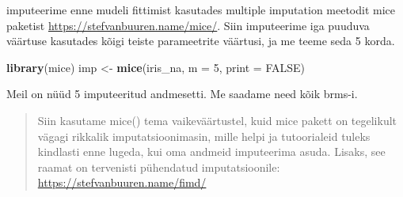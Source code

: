 \documentclass[]{book}
\newenvironment{Shaded}{\begin{snugshade}}{\end{snugshade}}
\newcommand{\KeywordTok}[1]{\textcolor[rgb]{0.13,0.29,0.53}{\textbf{#1}}}
\newcommand{\DataTypeTok}[1]{\textcolor[rgb]{0.13,0.29,0.53}{#1}}
\newcommand{\DecValTok}[1]{\textcolor[rgb]{0.00,0.00,0.81}{#1}}
\newcommand{\StringTok}[1]{\textcolor[rgb]{0.31,0.60,0.02}{#1}}
\newcommand{\CommentTok}[1]{\textcolor[rgb]{0.56,0.35,0.01}{\textit{#1}}}
\newcommand{\OtherTok}[1]{\textcolor[rgb]{0.56,0.35,0.01}{#1}}
\newcommand{\OperatorTok}[1]{\textcolor[rgb]{0.81,0.36,0.00}{\textbf{#1}}}
\newcommand{\NormalTok}[1]{#1}
\begin{document}
\begin{Shaded}
\end{Shaded}

\begin{Shaded}
\end{Shaded}

imputeerime enne mudeli fittimist kasutades multiple imputation meetodit
mice paketist \url{https://stefvanbuuren.name/mice/}. Siin imputeerime
iga puuduva väärtuse kasutades kõigi teiste parameetrite väärtusi, ja me
teeme seda 5 korda.

\begin{Shaded}
\begin{Highlighting}[]
\KeywordTok{library}\NormalTok{(mice)}
\NormalTok{imp <-}\StringTok{ }\KeywordTok{mice}\NormalTok{(iris_na, }\DataTypeTok{m =} \DecValTok{5}\NormalTok{, }\DataTypeTok{print =} \OtherTok{FALSE}\NormalTok{)}
\end{Highlighting}
\end{Shaded}

Meil on nüüd 5 imputeeritud andmesetti. Me saadame need kõik brms-i.

\begin{quote}
Siin kasutame mice() tema vaikeväärtustel, kuid mice pakett on
tegelikult vägagi rikkalik imputatsioonimasin, mille helpi ja
tutoorialeid tuleks kindlasti enne lugeda, kui oma andmeid imputeerima
asuda. Lisaks, see raamat on tervenisti pühendatud imputatsioonile:
\url{https://stefvanbuuren.name/fimd/}
\end{quote}
\end{document}
